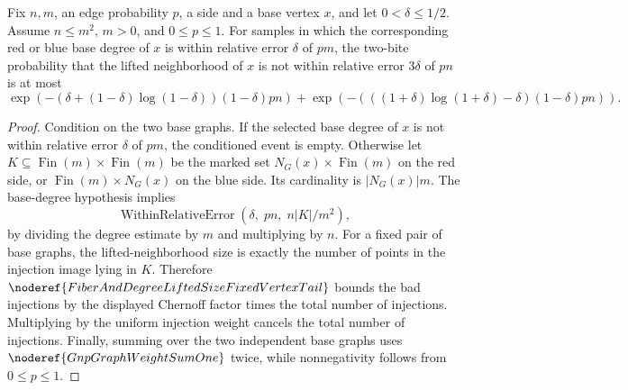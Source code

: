 \begin{helper}
Fix \(n,m\), an edge probability \(p\), a side and a base vertex \(x\), and
let \(0<\delta\le 1/2\).  Assume \(n\le m^2\), \(m>0\), and \(0\le p\le1\).
For samples in which the corresponding red or blue base degree of \(x\) is
within relative error \(\delta\) of \(pm\), the two-bite probability that the
lifted neighborhood of \(x\) is not within relative error \(3\delta\) of
\(pn\) is at most
\[
  \exp\!\left(-(\delta+(1-\delta)\log(1-\delta))(1-\delta)pn\right)
  +
  \exp\!\left(-(((1+\delta)\log(1+\delta)-\delta)(1-\delta)pn)\right).
\]
\end{helper}
\begin{proof}
Condition on the two base graphs.  If the selected base degree of \(x\) is not
within relative error \(\delta\) of \(pm\), the conditioned event is empty.
Otherwise let \(K\subseteq\operatorname{Fin}(m)\times\operatorname{Fin}(m)\)
be the marked set \(N_G(x)\times\operatorname{Fin}(m)\) on the red side, or
\(\operatorname{Fin}(m)\times N_G(x)\) on the blue side.  Its cardinality is
\(|N_G(x)|m\).  The base-degree hypothesis implies
\[
  \operatorname{WithinRelativeError}\!\left(
    \delta,\; pn,\; n|K|/m^2
  \right),
\]
by dividing the degree estimate by \(m\) and multiplying by \(n\).
For a fixed pair of base graphs, the lifted-neighborhood size is exactly the
number of points in the injection image lying in \(K\).  Therefore
\(\noderef{FiberAndDegreeLiftedSizeFixedVertexTail}\) bounds the bad
injections by the displayed Chernoff factor times the total number of
injections.  Multiplying by the uniform injection weight cancels the total
number of injections.  Finally, summing over the two independent base graphs
uses \(\noderef{GnpGraphWeightSumOne}\) twice, while nonnegativity follows
from \(0\le p\le1\).
\end{proof}
